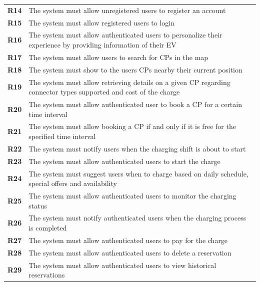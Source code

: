 \begin{table}[H]
    \begin{tabularx}{\textwidth}{cX}
        \toprule
        \textbf{R14} & The system must allow unregistered users to register an account                                                   \\
        \textbf{R15} & The system must allow registered users to login                                                                   \\
        \textbf{R16} & The system must allow authenticated users to personalize their experience by providing information of their EV    \\
        \textbf{R17} & The system must allow users to search for CPs in the map                                                          \\
        \textbf{R18} & The system must show to the users CPs nearby their current position                                               \\
        \textbf{R19} & The system must allow retrieving details on a given CP regarding connector types supported and cost of the charge \\
        \textbf{R20} & The system must allow authenticated user to book a CP for a certain time interval                                 \\
        \textbf{R21} & The system must allow booking a CP if and only if it is free for the specified time interval                      \\
        \textbf{R22} & The system must notify users when the charging shift is about to start                                            \\
        \textbf{R23} & The system must allow authenticated users to start the charge                                                     \\
        \textbf{R24} & The system must suggest users when to charge based on daily schedule, special offers and availability             \\
        \textbf{R25} & The system must allow authenticated users to monitor the charging status                                          \\
        \textbf{R26} & The system must notify authenticated users when the charging process is completed                                 \\
        \textbf{R27} & The system must allow authenticated users to pay for the charge                                                   \\
        \textbf{R28} & The system must allow authenticated users to delete a reservation                                                 \\
        \textbf{R29} & The system must allow authenticated users to view historical reservations                                         \\ \bottomrule
    \end{tabularx}
\end{table}

